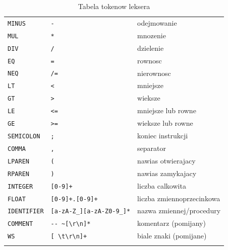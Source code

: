 \documentclass[12pt,a4paper]{article}
\begin{document}
\begin{longtable}{lll}
\texttt{MINUS}      & \texttt{-}                              & odejmowanie \\
\texttt{MUL}        & \texttt{*}                              & mnozenie \\
\texttt{DIV}        & \texttt{/}                              & dzielenie \\
\texttt{EQ}         & \texttt{=}                              & rownosc \\
\texttt{NEQ}        & \texttt{/=}                             & nierownosc \\
\texttt{LT}         & \texttt{<}                              & mniejsze \\
\texttt{GT}         & \texttt{>}                              & wieksze \\
\texttt{LE}         & \texttt{<=}                             & mniejsze lub rowne \\
\texttt{GE}         & \texttt{>=}                             & wieksze lub rowne \\
\texttt{SEMICOLON}  & \texttt{;}                              & koniec instrukcji \\
\texttt{COMMA}      & \texttt{,}                              & separator \\
\texttt{LPAREN}     & \texttt{(}                              & nawias otwierajacy \\
\texttt{RPAREN}     & \texttt{)}                              & nawias zamykajacy \\
\texttt{INTEGER}    & \texttt{[0-9]+}                         & liczba calkowita \\
\texttt{FLOAT}      & \texttt{[0-9]+.[0-9]+}                  & liczba zmiennoprzecinkowa \\
\texttt{IDENTIFIER} & \texttt{[a-zA-Z\_][a-zA-Z0-9\_]*}      & nazwa zmiennej/procedury \\
\texttt{COMMENT}    & \texttt{-{}- \textasciitilde[\textbackslash r\textbackslash n]*} & komentarz (pomijany) \\
\texttt{WS}         & \texttt{[ \textbackslash t\textbackslash r\textbackslash n]+}  & biale znaki (pomijane) \\
\bottomrule
\caption{Tabela tokenow leksera}
\end{longtable}
\end{document}
